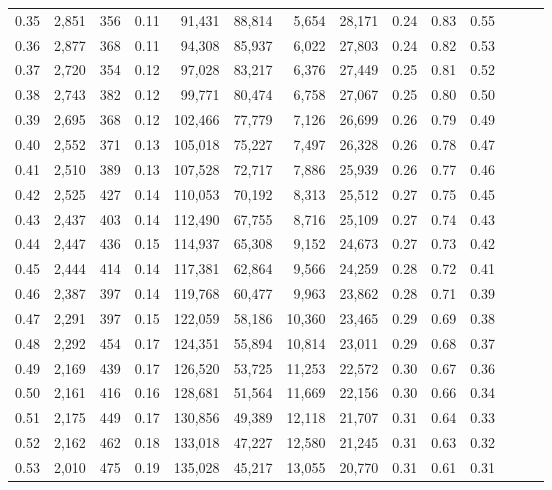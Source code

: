 \begin{tabular}{rrrrrrrrrrrrrr}
0.35 &  2,851 &  356 &  0.11 &   91,431 &   88,814 &   5,654 &  28,171 &  0.24 &  0.83 &      0.55 \\
0.36 &  2,877 &  368 &  0.11 &   94,308 &   85,937 &   6,022 &  27,803 &  0.24 &  0.82 &      0.53 \\
0.37 &  2,720 &  354 &  0.12 &   97,028 &   83,217 &   6,376 &  27,449 &  0.25 &  0.81 &      0.52 \\
0.38 &  2,743 &  382 &  0.12 &   99,771 &   80,474 &   6,758 &  27,067 &  0.25 &  0.80 &      0.50 \\
0.39 &  2,695 &  368 &  0.12 &  102,466 &   77,779 &   7,126 &  26,699 &  0.26 &  0.79 &      0.49 \\
0.40 &  2,552 &  371 &  0.13 &  105,018 &   75,227 &   7,497 &  26,328 &  0.26 &  0.78 &      0.47 \\
0.41 &  2,510 &  389 &  0.13 &  107,528 &   72,717 &   7,886 &  25,939 &  0.26 &  0.77 &      0.46 \\
0.42 &  2,525 &  427 &  0.14 &  110,053 &   70,192 &   8,313 &  25,512 &  0.27 &  0.75 &      0.45 \\
0.43 &  2,437 &  403 &  0.14 &  112,490 &   67,755 &   8,716 &  25,109 &  0.27 &  0.74 &      0.43 \\
0.44 &  2,447 &  436 &  0.15 &  114,937 &   65,308 &   9,152 &  24,673 &  0.27 &  0.73 &      0.42 \\
0.45 &  2,444 &  414 &  0.14 &  117,381 &   62,864 &   9,566 &  24,259 &  0.28 &  0.72 &      0.41 \\
0.46 &  2,387 &  397 &  0.14 &  119,768 &   60,477 &   9,963 &  23,862 &  0.28 &  0.71 &      0.39 \\
0.47 &  2,291 &  397 &  0.15 &  122,059 &   58,186 &  10,360 &  23,465 &  0.29 &  0.69 &      0.38 \\
0.48 &  2,292 &  454 &  0.17 &  124,351 &   55,894 &  10,814 &  23,011 &  0.29 &  0.68 &      0.37 \\
0.49 &  2,169 &  439 &  0.17 &  126,520 &   53,725 &  11,253 &  22,572 &  0.30 &  0.67 &      0.36 \\
0.50 &  2,161 &  416 &  0.16 &  128,681 &   51,564 &  11,669 &  22,156 &  0.30 &  0.66 &      0.34 \\
0.51 &  2,175 &  449 &  0.17 &  130,856 &   49,389 &  12,118 &  21,707 &  0.31 &  0.64 &      0.33 \\
0.52 &  2,162 &  462 &  0.18 &  133,018 &   47,227 &  12,580 &  21,245 &  0.31 &  0.63 &      0.32 \\
0.53 &  2,010 &  475 &  0.19 &  135,028 &   45,217 &  13,055 &  20,770 &  0.31 &  0.61 &      0.31 \\

\end{tabular}

